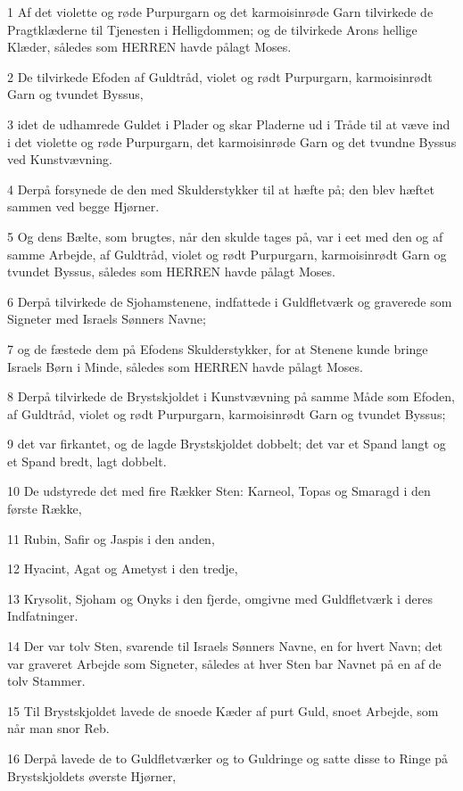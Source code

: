 \par 1 Af det violette og røde Purpurgarn og det karmoisinrøde Garn tilvirkede de Pragtklæderne til Tjenesten i Helligdommen; og de tilvirkede Arons hellige Klæder, således som HERREN havde pålagt Moses.
\par 2 De tilvirkede Efoden af Guldtråd, violet og rødt Purpurgarn, karmoisinrødt Garn og tvundet Byssus,
\par 3 idet de udhamrede Guldet i Plader og skar Pladerne ud i Tråde til at væve ind i det violette og røde Purpurgarn, det karmoisinrøde Garn og det tvundne Byssus ved Kunstvævning.
\par 4 Derpå forsynede de den med Skulderstykker til at hæfte på; den blev hæftet sammen ved begge Hjørner.
\par 5 Og dens Bælte, som brugtes, når den skulde tages på, var i eet med den og af samme Arbejde, af Guldtråd, violet og rødt Purpurgarn, karmoisinrødt Garn og tvundet Byssus, således som HERREN havde pålagt Moses.
\par 6 Derpå tilvirkede de Sjohamstenene, indfattede i Guldfletværk og graverede som Signeter med Israels Sønners Navne;
\par 7 og de fæstede dem på Efodens Skulderstykker, for at Stenene kunde bringe Israels Børn i Minde, således som HERREN havde pålagt Moses.
\par 8 Derpå tilvirkede de Brystskjoldet i Kunstvævning på samme Måde som Efoden, af Guldtråd, violet og rødt Purpurgarn, karmoisinrødt Garn og tvundet Byssus;
\par 9 det var firkantet, og de lagde Brystskjoldet dobbelt; det var et Spand langt og et Spand bredt, lagt dobbelt.
\par 10 De udstyrede det med fire Rækker Sten: Karneol, Topas og Smaragd i den første Række,
\par 11 Rubin, Safir og Jaspis i den anden,
\par 12 Hyacint, Agat og Ametyst i den tredje,
\par 13 Krysolit, Sjoham og Onyks i den fjerde, omgivne med Guldfletværk i deres Indfatninger.
\par 14 Der var tolv Sten, svarende til Israels Sønners Navne, en for hvert Navn; det var graveret Arbejde som Signeter, således at hver Sten bar Navnet på en af de tolv Stammer.
\par 15 Til Brystskjoldet lavede de snoede Kæder af purt Guld, snoet Arbejde, som når man snor Reb.
\par 16 Derpå lavede de to Guldfletværker og to Guldringe og satte disse to Ringe på Brystskjoldets øverste Hjørner,

